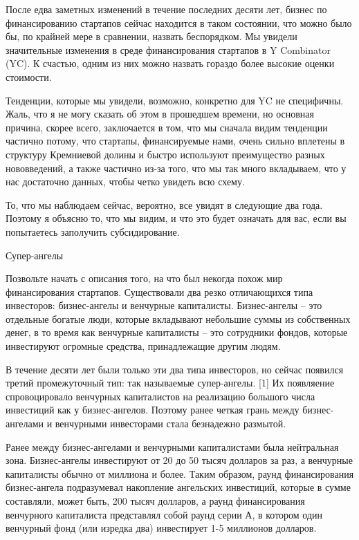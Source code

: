 \documentclass[ebook,12pt,oneside,openany]{memoir}
\begin{document}
\maketitle

После едва заметных изменений в течение последних десяти лет, бизнес
по финансированию стартапов сейчас находится в таком состоянии, что
можно было бы, по крайней мере в сравнении, назвать беспорядком. Мы
увидели значительные изменения в среде финансирования стартапов в Y
Combinator (YC). К счастью, одним из них можно назвать гораздо более
высокие оценки стоимости.

Тенденции, которые мы увидели, возможно, конкретно для YC не
специфичны. Жаль, что я не могу сказать об этом в прошедшем времени,
но основная причина, скорее всего, заключается в том, что мы сначала
видим тенденции частично потому, что стартапы, финансируемые нами,
очень сильно вплетены в структуру Кремниевой долины и быстро
используют преимущество разных нововведений, а также частично из-за
того, что мы так много вкладываем, что у нас достаточно данных, чтобы
четко увидеть всю схему.

То, что мы наблюдаем сейчас, вероятно, все увидят в следующие два
года. Поэтому я объясню то, что мы видим, и что это будет означать для
вас, если вы попытаетесь заполучить субсидирование.

Супер-ангелы

Позвольте начать с описания того, на что был некогда похож мир
финансирования стартапов. Существовали два резко отличающихся типа
инвесторов: бизнес-ангелы и венчурные капиталисты. Бизнес-ангелы – это
отдельные богатые люди, которые вкладывают небольшие суммы из
собственных денег, в то время как венчурные капиталисты – это
сотрудники фондов, которые инвестируют огромные средства,
принадлежащие другим людям.

В течение десяти лет были только эти два типа инвесторов, но сейчас
появился третий промежуточный тип: так называемые супер-ангелы. [1] Их
появляение спровоцировало венчурных капиталистов на реализацию
большого числа инвестиций как у бизнес-ангелов. Поэтому ранее четкая
грань между бизнес-ангелами и венчурными инвесторами стала безнадежно
размытой.

Ранее между бизнес-ангелами и венчурными капиталистами была
нейтральная зона. Бизнес-ангелы инвестируют от 20 до 50 тысяч долларов
за раз, а венчурные капиталисты обычно от миллиона и более. Таким
образом, раунд финансирования бизнес-ангела подразумевал накопление
ангельских инвестиций, которые в сумме составляли, может быть, 200
тысяч долларов, а раунд финансирования венчурного капиталиста
представлял собой раунд серии А, в котором один венчурный фонд (или
изредка два) инвестирует 1-5 миллионов долларов.
\end{document}
